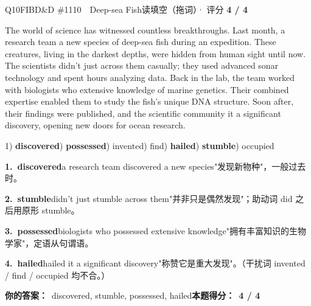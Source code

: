 \begin{qblock}{Q10\quad FIBD\&D \#1110\ \ Deep-sea Fish}{读填空（拖词）· 评分 \textcolor{cAccent}{\bfseries 4 / 4}}
\begin{promptbox}
The world of science has witnessed countless breakthroughs. Last month, a research team  a new species of deep-sea fish during an expedition. These creatures, living in the darkest depths, were hidden from human sight until now. The scientists didn't just  across them casually; they used advanced sonar technology and spent hours analyzing data. Back in the lab, the team worked with biologists who  extensive knowledge of marine genetics. Their combined expertise enabled them to study the fish's unique DNA structure. Soon after, their findings were published, and the scientific community  it a significant discovery, opening new doors for ocean research.
\end{promptbox}
{\small 1) \textbf{discovered}) \textbf{possessed}) invented) find) \textbf{hailed}) \textbf{stumble}) occupied}
\begin{notebox}\footnotesize
\textbf{1.\ discovered}\quad a research team discovered a new species"发现新物种"，一般过去时。\par\smallskip
\textbf{2.\ stumble}\quad didn't just stumble across them"并非只是偶然发现"；助动词 did 之后用原形 stumble。\par\smallskip
\textbf{3.\ possessed}\quad biologists who possessed extensive knowledge"拥有丰富知识的生物学家"，定语从句谓语。\par\smallskip
\textbf{4.\ hailed}\quad hailed it a significant discovery"称赞它是重大发现"。（干扰词 invented / find / occupied 均不合。）
\end{notebox}
\smallskip
\textbf{你的答案：}\ discovered, stumble, possessed, hailed\qquad\textbf{本题得分：}\ {\color{cAccent}\bfseries 4 / 4}
\end{qblock}

